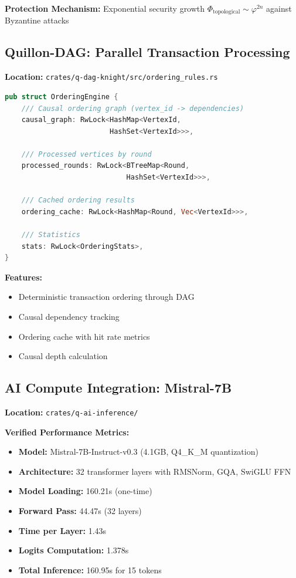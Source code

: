 \documentclass[11pt,a4paper]{article}
\begin{document}
\textbf{Protection Mechanism:} Exponential security growth $\Phi_{\text{topological}} \sim \varphi^{2n}$ against Byzantine attacks

\subsection{Quillon-DAG: Parallel Transaction Processing}

\textbf{Location:} \texttt{crates/q-dag-knight/src/ordering\_rules.rs}

\begin{lstlisting}[language=Rust,caption={Causal Ordering Engine}]
pub struct OrderingEngine {
    /// Causal ordering graph (vertex_id -> dependencies)
    causal_graph: RwLock<HashMap<VertexId,
                         HashSet<VertexId>>>,

    /// Processed vertices by round
    processed_rounds: RwLock<BTreeMap<Round,
                             HashSet<VertexId>>>,

    /// Cached ordering results
    ordering_cache: RwLock<HashMap<Round, Vec<VertexId>>>,

    /// Statistics
    stats: RwLock<OrderingStats>,
}
\end{lstlisting}

\textbf{Features:}
\begin{itemize}
    \item Deterministic transaction ordering through DAG
    \item Causal dependency tracking
    \item Ordering cache with hit rate metrics
    \item Causal depth calculation
\end{itemize}

\subsection{AI Compute Integration: Mistral-7B}

\textbf{Location:} \texttt{crates/q-ai-inference/}

\textbf{Verified Performance Metrics:}
\begin{itemize}
    \item \textbf{Model:} Mistral-7B-Instruct-v0.3 (4.1GB, Q4\_K\_M quantization)
    \item \textbf{Architecture:} 32 transformer layers with RMSNorm, GQA, SwiGLU FFN
    \item \textbf{Model Loading:} 160.21s (one-time)
    \item \textbf{Forward Pass:} 44.47s (32 layers)
    \item \textbf{Time per Layer:} 1.43s
    \item \textbf{Logits Computation:} 1.378s
    \item \textbf{Total Inference:} 160.95s for 15 tokens
\end{itemize}
\end{document}
